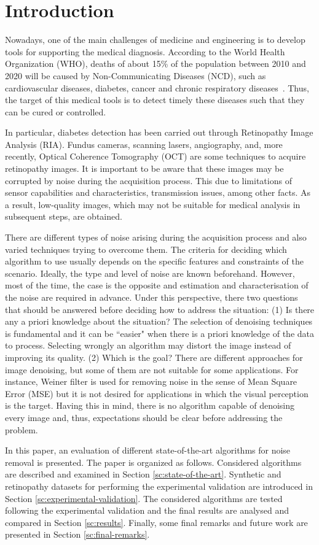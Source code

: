 \section{Introduction}

Nowadays, one of the main challenges of medicine and engineering is to develop tools for supporting the medical diagnosis. According to the World Health Organization (WHO), deaths of about 15\% of the population between 2010 and 2020 will be caused by Non-Communicating Diseases (NCD), such as cardiovascular diseases, diabetes, cancer and chronic respiratory diseases~\cite{who}. Thus, the target of this medical tools is to detect timely these diseases such that they can be cured or controlled.  %

In particular, diabetes detection has been carried out through Retinopathy Image Analysis (RIA). Fundus cameras, scanning lasers, angiography, and, more recently, Optical Coherence Tomography (OCT) are some techniques to acquire retinopathy images. It is important to be aware that these images may be corrupted by noise during the acquisition process. This due to limitations of sensor capabilities and characteristics, transmission issues, among other facts. As a result, low-quality images, which may not be suitable for medical analysis in subsequent steps, are obtained. 

There are different types of noise arising during the acquisition process and also varied techniques trying to overcome them. The criteria for deciding which algorithm to use usually depends on the specific features and constraints of the scenario. Ideally, the type and level of noise are known beforehand. However, most of the time, the case is the opposite and estimation and characterisation of the noise are required in advance. Under this perspective, there two questions that should be answered before deciding how to address the situation:
(1) Is there any a priori knowledge about the situation? The selection of denoising techniques is fundamental and it can be ``easier" when there is a priori knowledge of the data to process. Selecting wrongly an algorithm may distort the image instead of improving its quality. (2) Which is the goal? There are different approaches for image denoising, but some of them are not suitable for some applications. For instance, Weiner filter is used for removing noise in the sense of Mean Square Error (MSE) but it is not desired for applications in which the visual perception is the target. Having this in mind, there is no algorithm capable of denoising every image and, thus,  expectations should be clear before addressing the problem.

In this paper, an evaluation of different state-of-the-art algorithms for noise removal is presented. The paper is organized as follows. Considered algorithms are described and examined in Section \ref{sc:state-of-the-art}. Synthetic and retinopathy datasets for performing the experimental validation are introduced in Section \ref{sc:experimental-validation}. The considered algorithms are tested following the experimental validation and the final results are analysed and compared in Section \ref{sc:results}. Finally, some final remarks and future work are presented in Section \ref{sc:final-remarks}. 